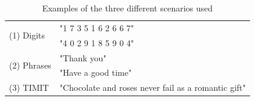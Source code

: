 \begin{table}[h]
    \begin{tabular}{l|p{6.2cm}}
        \multirow{2}{*}{(1) Digits}  
        & "1 7 3 5 1 6 2 6 6 7"\\
        & "4 0 2 9 1 8 5 9 0 4"\\
        \hline
        \multirow{2}{*}{(2) Phrases}  
        & "Thank you"\\
        & "Have a good time"\\
        \hline
        (3) TIMIT & "Chocolate and roses never fail as a romantic gift"
    \end{tabular}
    \caption{Examples of the three different scenarios used}
    \label{tab:ouluSecnarioExamp}
\end{table}
